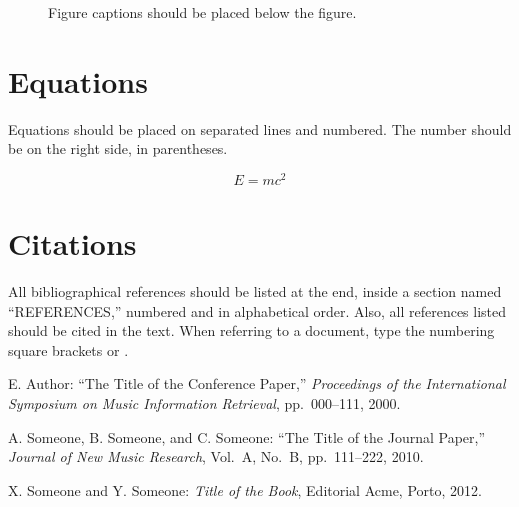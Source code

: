 \documentclass{article}
\begin{document}
\begin{figure}
 \centerline{}
 \caption{Figure captions should be placed below the figure.}
 \label{fig:example}
\end{figure}

\section{Equations}

Equations should be placed on separated lines and numbered.
The number should be on the right side, in parentheses.

\begin{equation}
E=mc^{2}
\end{equation}

\section{Citations}

All bibliographical references should be listed at the end,
inside a section named ``REFERENCES,'' numbered and in alphabetical order.
Also, all references listed should be cited in the text.
When referring to a document, type the numbering square brackets
\cite{Author:00} or \cite{Author:00,Someone:10,Someone:04}.

\begin{thebibliography}{citations}

E. Author:
``The Title of the Conference Paper,''
{\it Proceedings of the International Symposium
on Music Information Retrieval}, pp.~000--111, 2000.

A. Someone, B. Someone, and C. Someone:
``The Title of the Journal Paper,''
{\it Journal of New Music Research},
Vol.~A, No.~B, pp.~111--222, 2010.

 X. Someone and Y. Someone: {\it Title of the Book},
    Editorial Acme, Porto, 2012.

\end{thebibliography}

%
\end{document}
